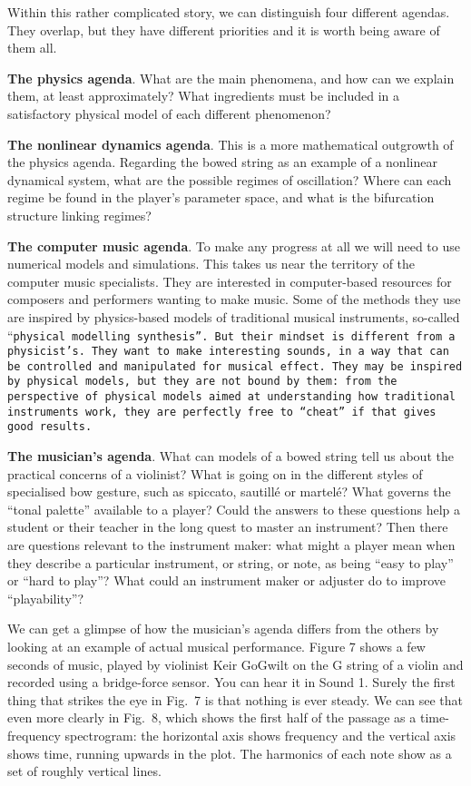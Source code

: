   Within this rather complicated story, we can distinguish four different 
  agendas. They overlap, but they have different priorities and it is worth 
  being aware of them all. 

  \textbf{The physics agenda}. What are the main phenomena, and how can we 
  explain them, at least approximately? What ingredients must be included in a 
  satisfactory physical model of each different phenomenon? 

  \textbf{The nonlinear dynamics agenda}. This is a more mathematical outgrowth 
  of the physics agenda. Regarding the bowed string as an example of a 
  nonlinear dynamical system, what are the possible regimes of oscillation? 
  Where can each regime be found in the player’s parameter space, and what is 
  the bifurcation structure linking regimes? 

  \textbf{The computer music agenda}. To make any progress at all we will need 
  to use numerical models and simulations. This takes us near the territory of 
  the computer music specialists. They are interested in computer-based 
  resources for composers and performers wanting to make music. Some of the 
  methods they use are inspired by physics-based models of traditional musical 
  instruments, so-called “\tt{}physical modelling synthesis\rm{}”. But their 
  mindset is different from a physicist’s. They want to make interesting 
  sounds, in a way that can be controlled and manipulated for musical effect. 
  They may be inspired by physical models, but they are not bound by them: from 
  the perspective of physical models aimed at understanding how traditional 
  instruments work, they are perfectly free to “cheat” if that gives good 
  results. 

  \textbf{The musician’s agenda}. What can models of a bowed string tell us 
  about the practical concerns of a violinist? What is going on in the 
  different styles of specialised bow gesture, such as spiccato, sautillé or 
  martelé? What governs the “tonal palette” available to a player? Could the 
  answers to these questions help a student or their teacher in the long quest 
  to master an instrument? Then there are questions relevant to the instrument 
  maker: what might a player mean when they describe a particular instrument, 
  or string, or note, as being “easy to play” or “hard to play”? What could an 
  instrument maker or adjuster do to improve “playability”? 

  We can get a glimpse of how the musician’s agenda differs from the others by 
  looking at an example of actual musical performance. Figure 7 shows a few 
  seconds of music, played by violinist Keir GoGwilt on the G string of a 
  violin and recorded using a bridge-force sensor. You can hear it in Sound 1. 
  Surely the first thing that strikes the eye in Fig.\ 7 is that nothing is 
  ever steady. We can see that even more clearly in Fig.\ 8, which shows the 
  first half of the passage as a time-frequency spectrogram: the horizontal 
  axis shows frequency and the vertical axis shows time, running upwards in the 
  plot. The harmonics of each note show as a set of roughly vertical lines. 


